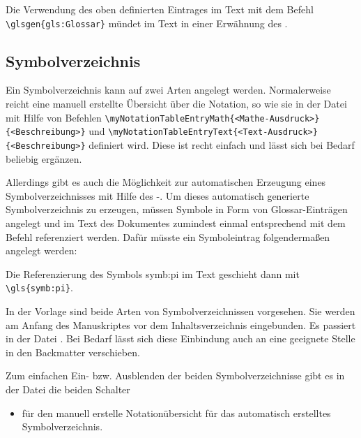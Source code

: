 Die Verwendung des oben definierten Eintrages im Text mit dem Befehl
\lstinline|\glsgen{gls:Glossar}| mündet im Text in einer Erwähnung des .


\subsection{Symbolverzeichnis}%
%
%
%
\label{sec:Symbolverz}
%
Ein Symbolverzeichnis kann auf zwei Arten angelegt werden.
Normalerweise reicht eine manuell erstellte Übersicht über die Notation,
so wie sie in der Datei 
mit Hilfe von Befehlen
\lstinline|\myNotationTableEntryMath{<Mathe-Ausdruck>}{<Beschreibung>}|
und
\lstinline|\myNotationTableEntryText{<Text-Ausdruck>}{<Beschreibung>}|
definiert wird.
Diese ist recht einfach und lässt sich bei Bedarf beliebig ergänzen.

Allerdings gibt es auch die Möglichkeit zur automatischen Erzeugung eines
Symbolverzeichnisses mit Hilfe des -.
Um dieses automatisch generierte Symbolverzeichnis zu erzeugen,
müssen Symbole in Form von Glossar-Einträgen angelegt und im Text des Dokumentes
zumindest einmal entsprechend mit dem Befehl  referenziert werden.
Dafür müsste ein Symboleintrag folgendermaßen angelegt werden:
\begin{latex}[caption={Definition eines Symboleintrages},label={lst:SymbEntry}]
\end{latex}
Die Referenzierung des Symbols \gls{symb:pi} im Text geschieht dann mit \verb+\gls{symb:pi}+.

In der Vorlage sind beide Arten von Symbolverzeichnissen vorgesehen.
Sie werden am Anfang des Manuskriptes vor dem Inhaltsverzeichnis eingebunden.
Es passiert in der Datei .
Bei Bedarf lässt sich diese Einbindung auch an eine geeignete Stelle in den Backmatter verschieben.

Zum einfachen Ein- bzw. Ausblenden der beiden Symbolverzeichnisse
gibt es in der Datei 
die beiden Schalter
\begin{itemize}
\item {} für den manuell erstelle Notationübersicht
 für das automatisch erstelltes Symbolverzeichnis.
\end{itemize}



